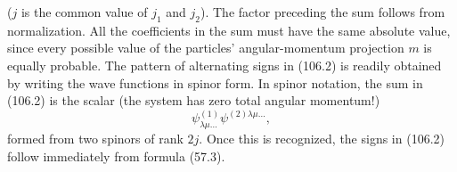 ($j$ is the common value of $j_1$ and $j_2$). The factor preceding the sum follows from normalization. All the coefficients in the sum must have the same absolute value, since every possible value of the particles' angular-momentum projection $m$ is equally probable. The pattern of alternating signs in (106.2) is readily obtained by writing the wave functions in spinor form. In spinor notation, the sum in (106.2) is the scalar (the system has zero total angular momentum!)
\begin{equation}
 \psi^{(1)}_{\lambda\mu\ldots}\psi^{(2)\lambda\mu\ldots},
 \tag{106.3}
\end{equation}
formed from two spinors of rank $2j$. Once this is recognized, the signs in (106.2) follow immediately from formula (57.3).

